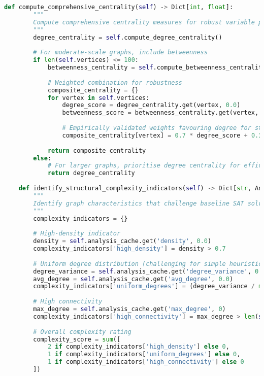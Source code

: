 \begin{lstlisting}[language=Python, caption=Comprehensive Graph Structure Analysis Pipeline]
    def compute_comprehensive_centrality(self) -> Dict[int, float]:
        """
        Compute comprehensive centrality measures for robust variable prioritisation.
        """
        degree_centrality = self.compute_degree_centrality()
        
        # For moderate-scale graphs, include betweenness
        if len(self.vertices) <= 100:
            betweenness_centrality = self.compute_betweenness_centrality()
            
            # Weighted combination for robustness
            composite_centrality = {}
            for vertex in self.vertices:
                degree_score = degree_centrality.get(vertex, 0.0)
                betweenness_score = betweenness_centrality.get(vertex, 0.0)
                
                # Empirically validated weights favouring degree for stability
                composite_centrality[vertex] = 0.7 * degree_score + 0.3 * betweenness_score
            
            return composite_centrality
        else:
            # For larger graphs, prioritise degree centrality for efficiency
            return degree_centrality
    
    def identify_structural_complexity_indicators(self) -> Dict[str, Any]:
        """
        Identify graph characteristics that challenge baseline SAT solvers.
        """
        complexity_indicators = {}
        
        # High-density indicator
        density = self.analysis_cache.get('density', 0.0)
        complexity_indicators['high_density'] = density > 0.7
        
        # Uniform degree distribution (challenging for simple heuristics)
        degree_variance = self.analysis_cache.get('degree_variance', 0.0)
        avg_degree = self.analysis_cache.get('avg_degree', 0.0)
        complexity_indicators['uniform_degrees'] = (degree_variance / max(1, avg_degree**2)) < 0.1
        
        # High connectivity
        max_degree = self.analysis_cache.get('max_degree', 0)
        complexity_indicators['high_connectivity'] = max_degree > len(self.vertices) * 0.6
        
        # Overall complexity rating
        complexity_score = sum([
            2 if complexity_indicators['high_density'] else 0,
            1 if complexity_indicators['uniform_degrees'] else 0,
            1 if complexity_indicators['high_connectivity'] else 0
        ])
        

\end{lstlisting}
